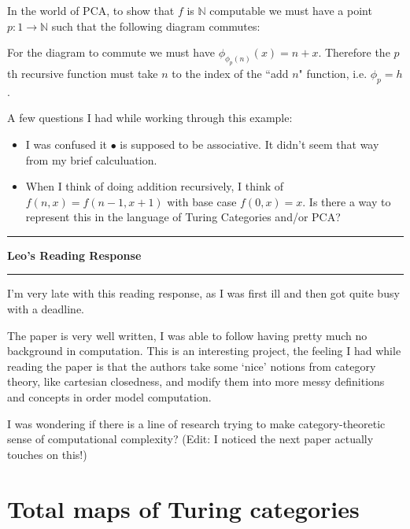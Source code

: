 \documentclass{amsart}
\newcommand{\iam}[1]{
  \vspace{0.25em}
  \hrule
  \vspace{0.25em}
  \textbf{{#1}'s Reading Response}
  \vspace{0.25em}
  \hrule
  \vspace{1em}
}
\begin{document}
In the world of PCA, to show that $f$ is $\mathbb N$ computable we must have a point $p: 1 \to \mathbb N$ such that the following diagram commutes:
\begin{center}
\end{center}

For the diagram to commute we must have $\phi_{\phi_p(n)}(x) = n + x$. Therefore the $p$th recursive function must take $n$ to the index of the ``add $n$" function, i.e. $\phi_p = h$.

A few questions I had while working through this example:
\begin{itemize}
    \item I was confused it $\bullet$ is supposed to be associative. It didn't seem that way from my brief calculuation.
    \item When I think of doing addition recursively, I think of $f(n,x) = f(n - 1, x+ 1)$ with base case $f(0, x) = x$. Is there a way to represent this in the language of Turing Categories and/or PCA?
\end{itemize}


\iam{Leo}
I'm very late with this reading response, as I was first ill and then got quite busy with a deadline.

The paper is very well written, I was able to follow having pretty much no background in computation. This is an interesting project, the feeling I had while reading the paper is that the authors take some `nice' notions from category theory, like cartesian closedness, and modify them into more messy definitions and concepts in order model computation.

I was wondering if there is a line of research trying to make category-theoretic sense of computational complexity? (Edit: I noticed the next paper actually touches on this!)



\section{Total maps of Turing categories}
\label{sec:total-maps}
\end{document}
